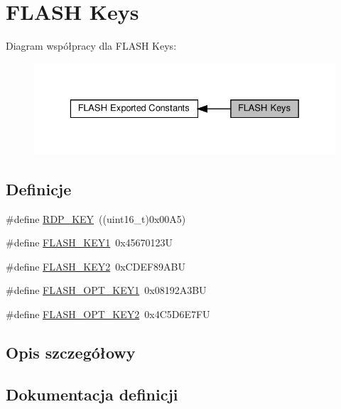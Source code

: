 \hypertarget{group___f_l_a_s_h___keys}{}\section{F\+L\+A\+SH Keys}
\label{group___f_l_a_s_h___keys}
Diagram współpracy dla F\+L\+A\+SH Keys\+:\nopagebreak
\begin{figure}[H]
\begin{center}
\leavevmode
\includegraphics[width=329pt]{group___f_l_a_s_h___keys}
\end{center}
\end{figure}
\subsection*{Definicje}
\begin{DoxyCompactItemize}
\item 
\#define \hyperlink{group___f_l_a_s_h___keys_gae497135e5528d69274bf8daf7f077f23}{R\+D\+P\+\_\+\+K\+EY}~((uint16\+\_\+t)0x00\+A5)
\item 
\#define \hyperlink{group___f_l_a_s_h___keys_gafd77e7bf91765d891ce63e2f0084b019}{F\+L\+A\+S\+H\+\_\+\+K\+E\+Y1}~0x45670123U
\item 
\#define \hyperlink{group___f_l_a_s_h___keys_gaee83d0f557e158da52f4a205db6b60a7}{F\+L\+A\+S\+H\+\_\+\+K\+E\+Y2}~0x\+C\+D\+E\+F89\+A\+BU
\item 
\#define \hyperlink{group___f_l_a_s_h___keys_gacebe54ff9ff12abcf0e4d3e697b2f116}{F\+L\+A\+S\+H\+\_\+\+O\+P\+T\+\_\+\+K\+E\+Y1}~0x08192\+A3\+BU
\item 
\#define \hyperlink{group___f_l_a_s_h___keys_ga636d46db38e376f0483eed4b7346697c}{F\+L\+A\+S\+H\+\_\+\+O\+P\+T\+\_\+\+K\+E\+Y2}~0x4\+C5\+D6\+E7\+FU
\end{DoxyCompactItemize}


\subsection{Opis szczegółowy}


\subsection{Dokumentacja definicji}
\mbox{\label{group___f_l_a_s_h___keys_gafd77e7bf91765d891ce63e2f0084b019}} 
